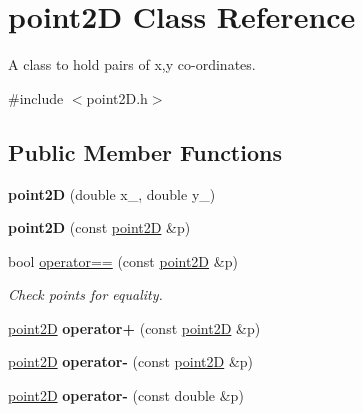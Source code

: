 \hypertarget{classpoint2D}{}\section{point2D Class Reference}
\label{classpoint2D}


A class to hold pairs of x,y co-\/ordinates.  




{\ttfamily \#include $<$point2\+D.\+h$>$}

\subsection*{Public Member Functions}
\begin{DoxyCompactItemize}
\item 
\mbox{\label{classpoint2D_ad3c713839ca9768e41c295b2e6e5afa7}} 
{\bfseries point2D} (double x\+\_\+, double y\+\_\+)
\item 
\mbox{\label{classpoint2D_ab5af14144bffe77818139d21003b58bb}} 
{\bfseries point2D} (const \mbox{\hyperlink{classpoint2D}{point2D}} \&p)
\item 
bool \mbox{\hyperlink{classpoint2D_a34b676d196277da05f03e87dc2f88288}{operator==}} (const \mbox{\hyperlink{classpoint2D}{point2D}} \&p)
\begin{DoxyCompactList}\small\item\em Check points for equality. \end{DoxyCompactList}\item 
\mbox{\label{classpoint2D_a76074a1176a4618c53d3f043bfdf6c63}} 
\mbox{\hyperlink{classpoint2D}{point2D}} {\bfseries operator+} (const \mbox{\hyperlink{classpoint2D}{point2D}} \&p)
\item 
\mbox{\label{classpoint2D_a09800bd3d11ba62ff77016c8d120dad6}} 
\mbox{\hyperlink{classpoint2D}{point2D}} {\bfseries operator-\/} (const \mbox{\hyperlink{classpoint2D}{point2D}} \&p)
\item 
\mbox{\label{classpoint2D_ae82aa8f1fb54ea829b5d96bf0abe2ee4}} 
\mbox{\hyperlink{classpoint2D}{point2D}} {\bfseries operator-\/} (const double \&p)
\item 
\mbox{\label{classpoint2D_aa083eccf18a944e03f097ec386d90f41}} 

\end{DoxyCompactItemize}
